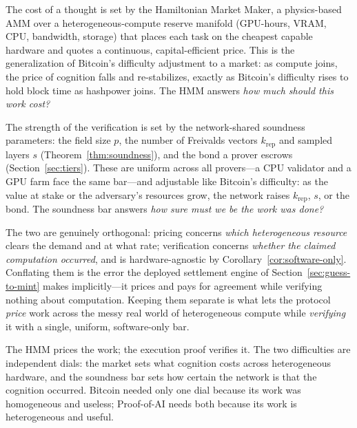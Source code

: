 \begin{description}[leftmargin=0pt,style=nextline]
\item[Difficulty-as-price (the HMM).] The cost of a thought is set by the Hamiltonian
Market Maker, a physics-based AMM over a heterogeneous-compute reserve manifold
(GPU-hours, VRAM, CPU, bandwidth, storage) that places each task on the cheapest
capable hardware and quotes a continuous, capital-efficient price. This is the
generalization of Bitcoin's difficulty adjustment to a market: as compute joins, the
price of cognition falls and re-stabilizes, exactly as Bitcoin's difficulty rises to
hold block time as hashpower joins. The HMM answers \emph{how much should this work
cost?}
\item[Difficulty-as-soundness-bar (this paper).] The strength of the verification is
set by the network-shared soundness parameters: the field size $p$, the number of
Freivalds vectors $k_{\mathrm{rep}}$ and sampled layers $s$
(Theorem~\ref{thm:soundness}), and the bond a prover escrows
(Section~\ref{sec:tiers}). These are uniform across all provers---a CPU validator and
a GPU farm face the same bar---and adjustable like Bitcoin's difficulty: as the value
at stake or the adversary's resources grow, the network raises $k_{\mathrm{rep}}$,
$s$, or the bond. The soundness bar answers \emph{how sure must we be the work was
done?}
\end{description}

The two are genuinely orthogonal: pricing concerns \emph{which heterogeneous
resource} clears the demand and at what rate; verification concerns \emph{whether the
claimed computation occurred}, and is hardware-agnostic by
Corollary~\ref{cor:software-only}. Conflating them is the error the deployed
settlement engine of Section~\ref{sec:guess-to-mint} makes implicitly---it prices
and pays for agreement while verifying nothing about computation. Keeping them
separate is what lets the protocol \emph{price} work across the messy real world of
heterogeneous compute while \emph{verifying} it with a single, uniform, software-only
bar.

\begin{principle}
\label{prin:price-verify}
The HMM prices the work; the execution proof verifies it. The two difficulties are
independent dials: the market sets what cognition costs across heterogeneous
hardware, and the soundness bar sets how certain the network is that the cognition
occurred. Bitcoin needed only one dial because its work was homogeneous and useless;
Proof-of-AI needs both because its work is heterogeneous and useful.
\end{principle}

